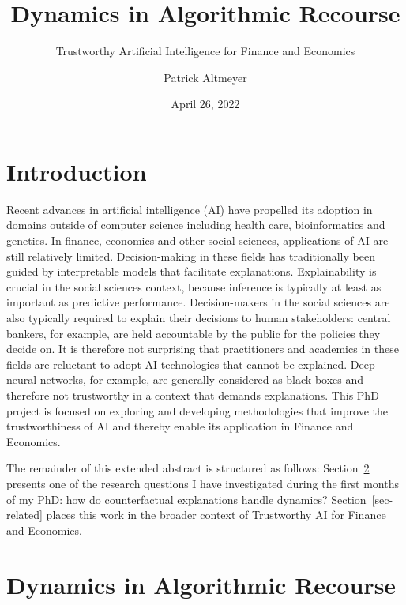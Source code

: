 \documentclass[
  sigconf]{acmart}
\author{Patrick Altmeyer}
\affiliation{%
  \institution{Delft University of Technology}
  \city{Delft}
  \country{The Netherlands}
}
\title{Dynamics in Algorithmic Recourse}
\subtitle{Trustworthy Artificial Intelligence for Finance and Economics}
\author{}
\date{April 26, 2022}
\begin{document}
\maketitle

\ifdefined\Shaded\renewenvironment{Shaded}{\begin{tcolorbox}[enhanced, frame hidden, borderline west={3pt}{0pt}{shadecolor}, breakable, sharp corners, interior hidden, boxrule=0pt]}{\end{tcolorbox}}\fi

\hypertarget{introduction}{%
\section{Introduction}\label{introduction}}

Recent advances in artificial intelligence (AI) have propelled its
adoption in domains outside of computer science including health care,
bioinformatics and genetics. In finance, economics and other social
sciences, applications of AI are still relatively limited.
Decision-making in these fields has traditionally been guided by
interpretable models that facilitate explanations. Explainability is
crucial in the social sciences context, because inference is typically
at least as important as predictive performance. Decision-makers in the
social sciences are also typically required to explain their decisions
to human stakeholders: central bankers, for example, are held
accountable by the public for the policies they decide on. It is
therefore not surprising that practitioners and academics in these
fields are reluctant to adopt AI technologies that cannot be explained.
Deep neural networks, for example, are generally considered as black
boxes and therefore not trustworthy in a context that demands
explanations. This PhD project is focused on exploring and developing
methodologies that improve the trustworthiness of AI and thereby enable
its application in Finance and Economics.

The remainder of this extended abstract is structured as follows:
Section~\ref{sec-main} presents one of the research questions I have
investigated during the first months of my PhD: how do counterfactual
explanations handle dynamics? Section~\ref{sec-related} places this work
in the broader context of Trustworthy AI for Finance and Economics.

\hypertarget{sec-main}{%
\section{Dynamics in Algorithmic Recourse}\label{sec-main}}
\end{document}
